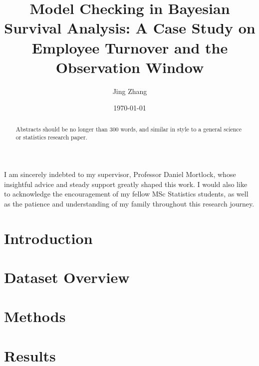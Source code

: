 \documentclass{statsmsc}
\title{Model Checking in Bayesian Survival Analysis: A Case Study on Employee Turnover and the Observation Window}
\author{Jing Zhang}
\date{\today}
\begin{document}
\maketitle

\declarationdate{\today}%
\declaration 


\begin{acknowledgements}
I am sincerely indebted to my supervisor, Professor Daniel Mortlock, whose insightful advice and steady support greatly shaped this work. I would also like to acknowledge the encouragement of my fellow MSc Statistics students, as well as the patience and understanding of my family throughout this research journey.
\end{acknowledgements}
\clearpage

\begin{abstract}
    Abstracts should be no longer than 300 words, and similar in style to a general science or statistics research paper.
\end{abstract}

\setcounter{tocdepth}{2} 
\tableofcontents
\clearpage

\mainmatter

%

\section{Introduction}

\section{Dataset Overview}

\section{Methods}\label{sec:methods}

\section{Results}
\label{sec:results}

\end{document}
